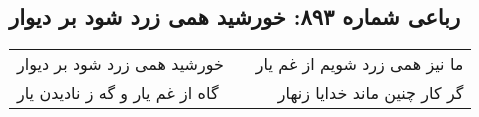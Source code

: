 \begin{center}
\section*{رباعی شماره ۸۹۳: خورشید همی زرد شود بر دیوار}
\label{sec:0893}
\begin{longtable}{l p{0.5cm} r}
خورشید همی زرد شود بر دیوار
&&
ما نیز همی زرد شویم از غم یار
\\
گاه از غم یار و گه ز نادیدن یار
&&
گر کار چنین ماند خدایا زنهار
\\
\end{longtable}
\end{center}
